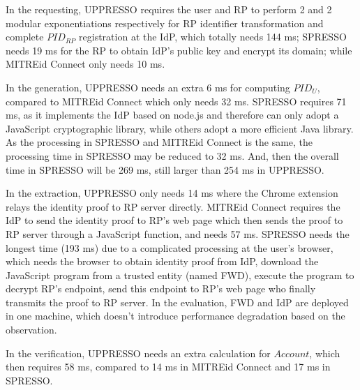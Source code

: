 In the requesting, UPPRESSO requires the user and RP to perform 2 and 2  modular exponentiations respectively for RP identifier transformation 
and complete $PID_{RP}$ registration at the IdP, which totally needs 144 ms;
SPRESSO needs 19 ms for the RP to obtain IdP's public key and encrypt its domain;
while MITREid Connect only needs 10 ms.

In the generation, UPPRESSO needs  an extra 6 ms for computing $PID_U$, compared to MITREid Connect which only needs 32 ms.
SPRESSO requires 71 ms, as it implements the IdP based on node.js and therefore can only adopt a JavaScript cryptographic library, while others adopt a more efficient Java library.
As the processing in SPRESSO and MITREid Connect is the same, the processing time in SPRESSO may be reduced to 32 ms.
And, then the overall time in SPRESSO will be 269 ms, still larger than 254 ms in UPPRESSO.

In the extraction, UPPRESSO only needs 14 ms where the Chrome extension relays the identity proof to RP server directly.
MITREid Connect requires the IdP to send the identity proof to  RP's web page which then sends the proof to RP server through a JavaScript function, and needs 57 ms.
SPRESSO needs the longest time (193 ms) due to a complicated processing at the user's browser,
  which needs the browser to obtain identity proof from IdP, download the JavaScript program from a trusted entity (named FWD), execute the program to decrypt RP's endpoint, send this endpoint to RP's web page who finally transmits the proof to RP server.
In the evaluation,  FWD and IdP are deployed in one machine, which doesn't introduce performance degradation based on the observation. %



In the verification, UPPRESSO needs an extra calculation for $Account$, which then requires  58 ms,
 compared to 14 ms in MITREid Connect and 17 ms in SPRESSO.



